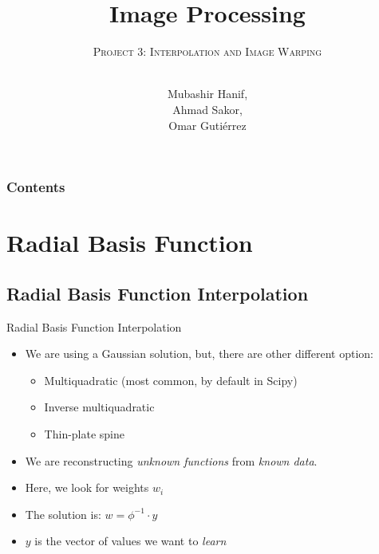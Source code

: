 \documentclass[xcolor={x11names,svgnames,dvipsnames},trans]{beamer}
\author[Mubashir Hanif\\, Ahmad Sakor\\, Omar Gutiérrez]{\texorpdfstring{Mubashir Hanif,\\ Ahmad Sakor,\\ Omar Gutiérrez}{Mubashir Hanif, Ahmad, Omar Gutiérrez}}
\title{Image Processing}
\subtitle{\texorpdfstring{\textsc{Project 3: Interpolation and Image Warping}\\%
\hrulefill\ \adforn{57}\thickspace\thickspace\adforn{29}\ \hrulefill}{}}
\date[\ccbyncsa]{\ccbyncsa}
\begin{document}
\begin{frame}[plain]
\maketitle
\end{frame}

\begin{frame} \frametitle{Contents}
    \tableofcontents
\end{frame}


\section{Radial Basis Function}
\subsection{Radial Basis Function Interpolation}
\begin{frame}{Radial Basis Function Interpolation}
    \begin{itemize}
        \item We are using a Gaussian solution, but, there are other different option:
            \begin{itemize}
                \item Multiquadratic (most common, by default in Scipy)
                \item Inverse multiquadratic
                \item Thin-plate spine
            \end{itemize}
        \item We are reconstructing \textit{unknown functions} from \textit{known data}.
        \item Here, we look for weights $w_i$ 
        \item The solution is: $w = \phi^{-1} \cdot y$
        \item $y$ is the vector of values we want to \textit{learn}
    \end{itemize}
\end{frame}
\end{document}
